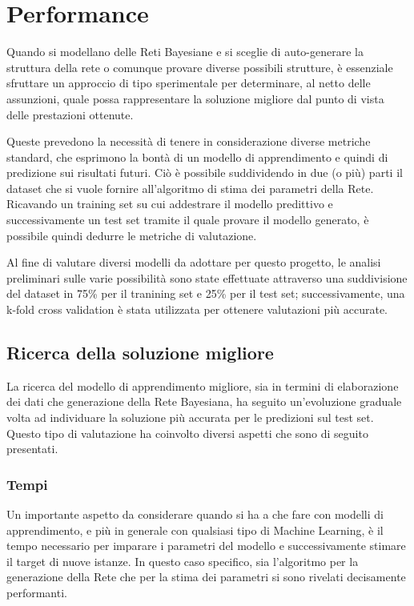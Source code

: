 \documentclass[hidelinks, 12pt]{article}
\begin{document}
\clearpage



\section{Performance}

Quando si modellano delle Reti Bayesiane e si sceglie di auto-generare la struttura della rete o comunque provare diverse possibili strutture, è essenziale sfruttare un approccio di tipo sperimentale per determinare, al netto delle assunzioni, quale possa rappresentare la soluzione migliore dal punto di vista delle prestazioni ottenute.

Queste prevedono la necessità di tenere in considerazione diverse metriche standard, che esprimono la bontà di un modello di apprendimento e quindi di predizione sui risultati futuri. Ciò è possibile suddividendo in due (o più) parti il dataset che si vuole fornire all'algoritmo di stima dei parametri della Rete. Ricavando un training set su cui addestrare il modello predittivo e successivamente un test set tramite il quale provare il modello generato, è possibile quindi dedurre le metriche di valutazione.

Al fine di valutare diversi modelli da adottare per questo progetto, le analisi preliminari sulle varie possibilità sono state effettuate attraverso una suddivisione del dataset in 75\% per il tranining set e 25\% per il test set; successivamente, una k-fold cross validation è stata utilizzata per ottenere valutazioni più accurate.



\subsection{Ricerca della soluzione migliore}

La ricerca del modello di apprendimento migliore, sia in termini di elaborazione dei dati che generazione della Rete Bayesiana, ha seguito un'evoluzione graduale volta ad individuare la soluzione più accurata per le predizioni sul test set. Questo tipo di valutazione ha coinvolto diversi aspetti che sono di seguito presentati.


\subsubsection{Tempi}

Un importante aspetto da considerare quando si ha a che fare con modelli di apprendimento, e più in generale con qualsiasi tipo di Machine Learning, è il tempo necessario per imparare i parametri del modello e successivamente stimare il target di nuove istanze. In questo caso specifico, sia l'algoritmo per la generazione della Rete che per la stima dei parametri si sono rivelati decisamente performanti.
\end{document}
